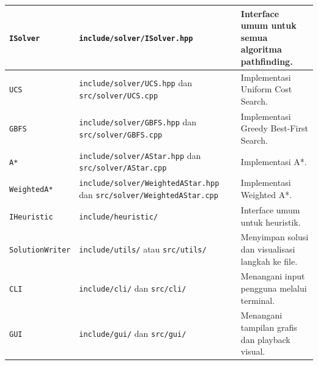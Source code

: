 \begin{longtable}{
	|>{\raggedright\arraybackslash}p{3.1cm}
	|>{\raggedright\arraybackslash}p{4.7cm}
	|>{\raggedright\arraybackslash}p{5.4cm}|
}
	\texttt{ISolver} 
	& \texttt{include/solver/}\newline\texttt{ISolver.hpp} 
	& Interface umum untuk semua algoritma pathfinding. \\
	\hline
	
	\texttt{UCS} 
	& \texttt{include/solver/}\newline\texttt{UCS.hpp} dan \newline\texttt{src/solver/}\newline\texttt{UCS.cpp} 
	& Implementasi Uniform Cost Search. \\
	\hline
	
	\texttt{GBFS} 
	& \texttt{include/solver/}\newline\texttt{GBFS.hpp} dan \newline\texttt{src/solver/}\newline\texttt{GBFS.cpp} 
	& Implementasi Greedy Best-First Search. \\
	\hline
	
	\texttt{A*} 
	& \texttt{include/solver/}\newline\texttt{AStar.hpp} dan \newline\texttt{src/solver/}\newline\texttt{AStar.cpp} 
	& Implementasi A*. \\
	\hline
	
	\texttt{WeightedA*} 
	& \texttt{include/solver/}\newline\texttt{WeightedAStar.hpp} dan \newline\texttt{src/solver/}\newline\texttt{WeightedAStar.cpp} 
	& Implementasi Weighted A*. \\
	\hline
	
	\texttt{IHeuristic} 
	& \texttt{include/heuristic/} 
	& Interface umum untuk heuristik. \\
	\hline
	
	\texttt{SolutionWriter} 
	& \texttt{include/utils/} atau \texttt{src/utils/} 
	& Menyimpan solusi dan visualisasi langkah ke file. \\
	\hline
	
	\texttt{CLI} 
	& \texttt{include/cli/} dan \texttt{src/cli/} 
	& Menangani input pengguna melalui terminal. \\
	\hline
	
	\texttt{GUI} 
	& \texttt{include/gui/} dan \texttt{src/gui/} 
	& Menangani tampilan grafis dan playback visual. \\
	\hline
\end{longtable}

